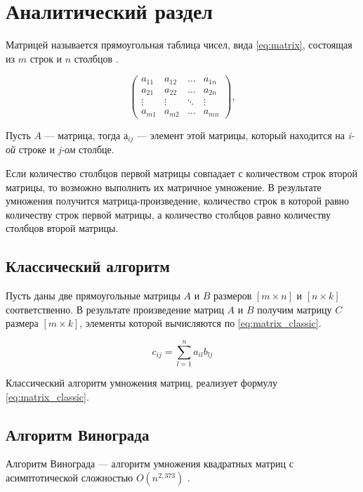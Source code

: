 \chapter{Аналитический раздел}

Матрицей называется прямоугольная таблица чисел, вида \eqref{eq:matrix}, состоящая из $m$ строк и $n$ столбцов \cite{matrix}.

\begin{equation}
	\label{eq:matrix}
	\begin{pmatrix}
		a_{11} & a_{12} & \ldots & a_{1n}\\
		a_{21} & a_{22} & \ldots & a_{2n}\\
		\vdots & \vdots & \ddots & \vdots\\
		a_{m1} & a_{m2} & \ldots & a_{mn}
	\end{pmatrix},
\end{equation}

Пусть $A$ --- матрица, тогда $а_{ij}$ --- элемент этой матрицы, который находится на \textit{i-ой} строке и \textit{j-ом} столбце.

Если количество столбцов первой матрицы совпадает с количеством строк второй матрицы, то возможно выполнить их матричное умножение. В результате умножения получится матрица-произведение, количество строк в которой равно количеству строк первой матрицы, а количество столбцов равно количеству столбцов второй матрицы.

\section{Классический алгоритм}

Пусть даны две прямоугольные матрицы $A$ и $B$ размеров $[m \times n]$ и $[n \times k]$ соответственно. В результате произведение матриц $A$ и $B$ получим матрицу $C$ размера $[m \times k]$, элементы которой вычисляются по \eqref{eq:matrix_classic}.

\begin{equation}
	\label{eq:matrix_classic}
	c_{ij} = \sum_{l=1}^{n}a_{il}b_{lj}
\end{equation}

Классический алгоритм умножения матриц, реализует формулу \eqref{eq:matrix_classic}.

\section{Алгоритм Винограда}

Алгоритм Винограда --- алгоритм умножения квадратных матриц с асимптотической сложностью $O(n^{2,373})$ \cite{book_vinograd}.


